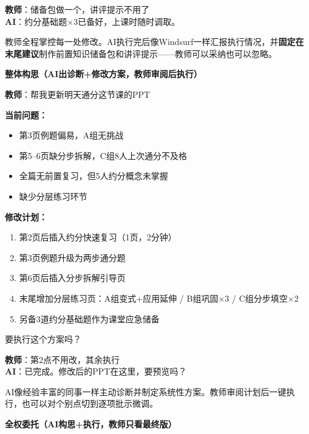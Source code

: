 \documentclass[11pt,a4paper]{article}
\newcommand{\done}{\ding{192}}
\newcommand{\dtwo}{\ding{193}}
\newcommand{\dthree}{\ding{194}}
\begin{document}
\begin{dialogue}
\textbf{教师}：储备包做一个，讲评提示不用了\\
\textbf{AI}：约分基础题$\times$3已备好，上课时随时调取。
\end{dialogue}

教师全程掌控每一处修改。AI执行完后像Windsurf一样汇报执行情况，并\textbf{固定在末尾建议}制作前置知识储备包和讲评提示——教师可以采纳也可以忽略。

\bigskip
\noindent\textbf{\dtwo{} 整体构思（AI出诊断+修改方案，教师审阅后执行）}

\begin{dialogue}
\textbf{教师}：帮我更新明天通分这节课的PPT
\end{dialogue}

\begin{aiplan}[PPT诊断与修改方案]
\textbf{当前问题：}
\begin{itemize}[leftmargin=1.5em,nosep]
  \item 第3页例题偏易，A组无挑战
  \item 第5--6页缺分步拆解，C组8人上次通分不及格
  \item 全篇无前置复习，但5人约分概念未掌握
  \item 缺少分层练习环节
\end{itemize}
\medskip
\textbf{修改计划：}
\begin{enumerate}[leftmargin=1.5em,nosep]
  \item 第2页后插入约分快速复习（1页，2分钟）
  \item 第3页例题升级为两步通分题
  \item 第6页后插入分步拆解引导页
  \item 末尾增加分层练习页：A组变式+应用延伸 / B组巩固$\times$3 / C组分步填空$\times$2
  \item 另备3道约分基础题作为课堂应急储备
\end{enumerate}
\medskip
要执行这个方案吗？
\end{aiplan}

\begin{dialogue}
\textbf{教师}：第2点不用改，其余执行\\
\textbf{AI}：已完成。修改后的PPT在这里，要预览吗？
\end{dialogue}

AI像经验丰富的同事一样主动诊断并制定系统性方案。教师审阅计划后一键执行，也可以对个别点切到\done{}逐项批示微调。

\bigskip
\noindent\textbf{\dthree{} 全权委托（AI构思+执行，教师只看最终版）}
\end{document}
